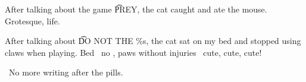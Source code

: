 After talking about the game \t{PREY}, the cat caught and ate the mouse. Grotesque, life.

After talking about \t{DO NOT THE \%s}, the cat sat on my bed and stopped using claws when playing. Bed \emdash\ no , paws without injuries \emdash\ cute, cute, cute!

\hatw\ No more writing after the pills.

